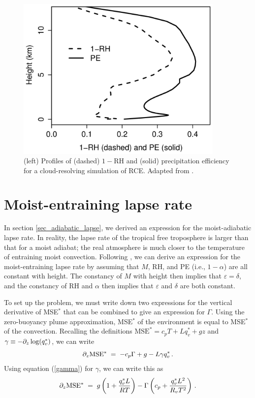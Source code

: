 \documentclass[12pt]{article}
\newcommand{\rh}{{\text{RH}}}
\newcommand{\mse}{{\text{MSE}}}
\begin{document}
\begin{figure}
\begin{center}
\includegraphics[width=4in]{../figures/17leshouches_precipeff.png}
\caption{(left) Profiles of (dashed) $1-\rh$ and (solid) precipitation efficiency for a cloud-resolving simulation of RCE.  Adapted from \citet{13lapse}.}
\label{17leshouches_precipeff}
\end{center}
\end{figure}


\section{Moist-entraining lapse rate}


In section \ref{sec_adiabatic_lapse}, we derived an expression for the moist-adiabatic lapse rate.  In reality, the lapse rate of the tropical free troposphere is larger than that for a moist adiabat; the real atmosphere is much closer to the temperature of entraining moist convection.  Following \citet{15cape}, we can derive an expression for the moist-entraining lapse rate by assuming that $M$, RH, and PE (i.e., $1-\alpha$) are all constant with height.  The constancy of $M$ with height then implies that $\varepsilon = \delta$, and the constancy of RH and $\alpha$ then implies that $\varepsilon$ and $\delta$ are both constant.


To set up the problem, we must write down two expressions for the vertical derivative of MSE$^*$ that can be combined to give an expression for $\Gamma$.  Using the zero-buoyancy plume approximation, MSE$^*$ of the environment is equal to MSE$^*$ of the convection.  Recalling the definitions $\mse^* = c_p T + L q_v^* + gz$ and $\gamma \equiv -\partial_z \log(q_v^*)$, we can write
\[
\ppz \mse{}^* \; = \; -c_p \Gamma + g - L \gamma q_v^* \, .
\]
Using equation (\ref{gamma}) for $\gamma$, we can write this as
\begin{equation}
\ppz \mse{}^* \; = \; g \left( 1 + \frac{q_v^* L}{R T} \right) - \Gamma \left( c_p + \frac{q_v^* L^2}{R_v T^2} \right) \, . \label{dhsdz_1}
\end{equation}
\end{document}
